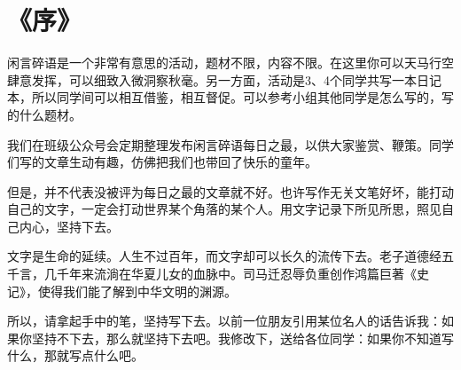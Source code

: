 \chapter*{《序》}
闲言碎语是一个非常有意思的活动，题材不限，内容不限。在这里你可以天马行空肆意发挥，可以细致入微洞察秋毫。另一方面，活动是3、4个同学共写一本日记本，所以同学间可以相互借鉴，相互督促。可以参考小组其他同学是怎么写的，写的什么题材。

我们在班级公众号会定期整理发布闲言碎语每日之最，以供大家鉴赏、鞭策。同学们写的文章生动有趣，仿佛把我们也带回了快乐的童年。

但是，并不代表没被评为每日之最的文章就不好。也许写作无关文笔好坏，能打动自己的文字，一定会打动世界某个角落的某个人。用文字记录下所见所思，照见自己内心，坚持下去。

文字是生命的延续。人生不过百年，而文字却可以长久的流传下去。老子道德经五千言，几千年来流淌在华夏儿女的血脉中。司马迁忍辱负重创作鸿篇巨著《史记》，使得我们能了解到中华文明的渊源。

所以，请拿起手中的笔，坚持写下去。以前一位朋友引用某位名人的话告诉我：如果你坚持不下去，那么就坚持下去吧。我修改下，送给各位同学：如果你不知道写什么，那就写点什么吧。
